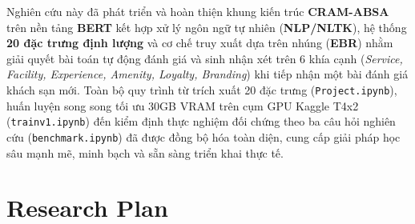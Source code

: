 \documentclass[pdflatex,sn-mathphys-num]{sn-jnl}
\theoremstyle{thmstyleone}
\theoremstyle{thmstyletwo}
\theoremstyle{thmstylethree}
\begin{document}
Nghiên cứu này đã phát triển và hoàn thiện khung kiến trúc \textbf{CRAM-ABSA} trên nền tảng \textbf{BERT} kết hợp xử lý ngôn ngữ tự nhiên (\textbf{NLP/NLTK}), hệ thống \textbf{20 đặc trưng định lượng} và cơ chế truy xuất dựa trên nhúng (\textbf{EBR}) nhằm giải quyết bài toán tự động đánh giá và sinh nhận xét trên 6 khía cạnh (\textit{Service, Facility, Experience, Amenity, Loyalty, Branding}) khi tiếp nhận một bài đánh giá khách sạn mới. Toàn bộ quy trình từ trích xuất 20 đặc trưng (\texttt{Project.ipynb}), huấn luyện song song tối ưu 30GB VRAM trên cụm GPU Kaggle T4x2 (\texttt{trainv1.ipynb}) đến kiểm định thực nghiệm đối chứng theo ba câu hỏi nghiên cứu (\texttt{benchmark.ipynb}) đã được đồng bộ hóa toàn diện, cung cấp giải pháp học sâu mạnh mẽ, minh bạch và sẵn sàng triển khai thực tế.

\section{Research Plan}
\label{sec:plan}
\end{document}
